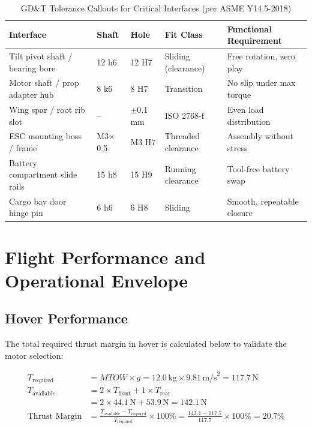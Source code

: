 \begin{table}[H]
\centering
\small
\caption{GD\&T Tolerance Callouts for Critical Interfaces (per ASME Y14.5-2018)}
\begin{tabularx}{\textwidth}{L{4cm} C{2.2cm} C{2.2cm} C{2cm} X}
\toprule
\textbf{Interface} &
\textbf{Shaft} &
\textbf{Hole} &
\textbf{Fit Class} &
\textbf{Functional Requirement} \\
\midrule
Tilt pivot shaft / bearing bore & 12 h6 & 12 H7 & Sliding (clearance) & Free rotation, zero play \\
Motor shaft / prop adapter hub  & 8 k6  & 8 H7  & Transition          & No slip under max torque \\
Wing spar / root rib slot       & --    & $\pm$0.1 mm & ISO 2768-f     & Even load distribution \\
ESC mounting boss / frame       & M3$\times$0.5 & M3 H7 & Threaded clearance & Assembly without stress \\
Battery compartment slide rails & 15 h8 & 15 H9 & Running clearance   & Tool-free battery swap \\
Cargo bay door hinge pin        & 6 h6  & 6 H8  & Sliding             & Smooth, repeatable closure \\
\bottomrule
\end{tabularx}
\end{table}

\section{Flight Performance and Operational Envelope}

\subsection{Hover Performance}

The total required thrust margin in hover is calculated below to validate the motor selection:

\begin{align}
  T_{\text{required}} &= MTOW \times g = 12.0\,\text{kg} \times 9.81\,\text{m/s}^2 = 117.7\,\text{N} \\
  T_{\text{available}} &= 2 \times T_{\text{front}} + 1 \times T_{\text{rear}} \nonumber \\
                       &= 2 \times 44.1\,\text{N} + 53.9\,\text{N} = 142.1\,\text{N} \\
  \text{Thrust Margin} &= \frac{T_{\text{available}} - T_{\text{required}}}{T_{\text{required}}} \times 100\%
                       = \frac{142.1 - 117.7}{117.7} \times 100\% = \mathbf{20.7\%}
\end{align}

